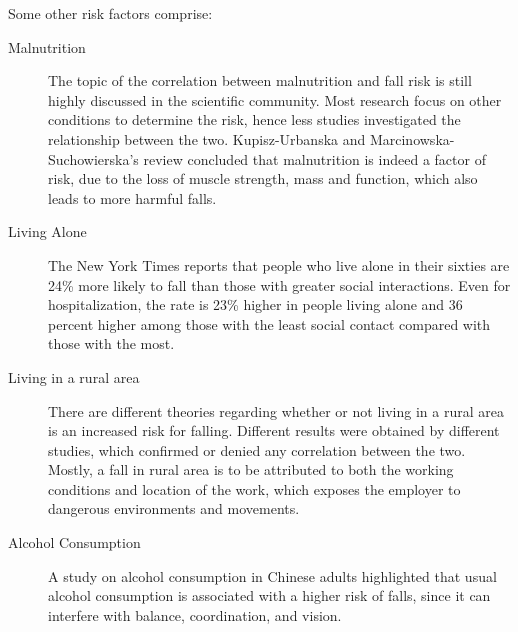 Some other risk factors comprise:
\begin{description}
  \item[Malnutrition] The topic of the correlation between malnutrition and fall risk is still highly discussed in the scientific community. Most research focus on other conditions to determine the risk, hence less studies investigated the relationship between the two. Kupisz-Urbanska and Marcinowska-Suchowierska's review \cite{MalnutritionRisk} concluded that malnutrition is indeed a factor of risk, due to the loss of muscle strength, mass and function, which also leads to more harmful falls.
  \item[Living Alone] The New York Times \cite{AloneRisk} reports that people who live alone in their sixties are 24\% more likely to fall than those with greater social interactions. Even for hospitalization, the rate is 23\% higher in people living alone and 36 percent higher among those with the least social contact compared with those with the most.
  \item[Living in a rural area] There are different theories regarding whether or not living in a rural area is an increased risk for falling. Different results were obtained by different studies, which confirmed or denied any correlation between the two. Mostly, a fall in rural area is to be attributed to both the working conditions and location of the work, which exposes the employer to dangerous environments and movements.
  \item[Alcohol Consumption] A study on alcohol consumption in Chinese adults \cite{AlcoholRisk} highlighted that usual alcohol consumption is associated with a higher risk of falls, since it can interfere with balance, coordination, and vision.
\end{description}

